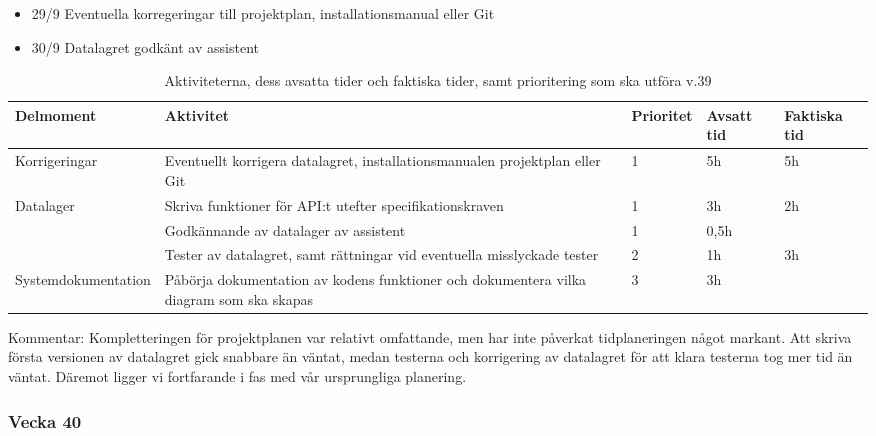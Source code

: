 \documentclass{TDP003mall}
\begin{document}
\begin{itemize}
\color{red}
    \item 29/9 Eventuella korregeringar till projektplan, installationsmanual eller Git

    \item 30/9 Datalagret godkänt av assistent
\end{itemize}

\begin{table}[h]
{\centering\begin{tabularx}{\textwidth}{|l|X|l|l|l|}
  \hline
    Delmoment & Aktivitet & Prioritet & Avsatt tid & Faktiska tid\\ \hline
    Korrigeringar        & Eventuellt korrigera datalagret, installationsmanualen projektplan eller Git  & 1   & 5h       & 5h    \\  \hline
    \multirow{3}{*}{Datalager} & Skriva funktioner för API:t utefter specifikationskraven       & 1        & 3h         &  2h          \\ \cline{2-5}
        & Godkännande av datalager av assistent      & 1    & 0,5h     &      \\  \cline{2-5}
        & Tester av datalagret, samt rättningar vid eventuella misslyckade tester    & 2      & 1h         &  3h          \\  \hline
    Systemdokumentation & Påbörja dokumentation av kodens funktioner och dokumentera vilka diagram som ska skapas     & 3 & 3h     &    \\
     \hline
\end{tabularx}\par}
\centering
    \caption{\label{tab:table-name}Aktiviteterna, dess avsatta tider och faktiska tider, samt prioritering som ska utföra v.39}

\end{table}

Kommentar: Kompletteringen för projektplanen var relativt omfattande, men har inte påverkat tidplaneringen något markant. Att skriva första versionen av datalagret gick snabbare än väntat, medan testerna och korrigering av datalagret för att klara testerna tog mer tid än väntat. Däremot ligger vi fortfarande i fas med vår ursprungliga planering.

\pagebreak

\subsubsection*{Vecka 40}
\end{document}
